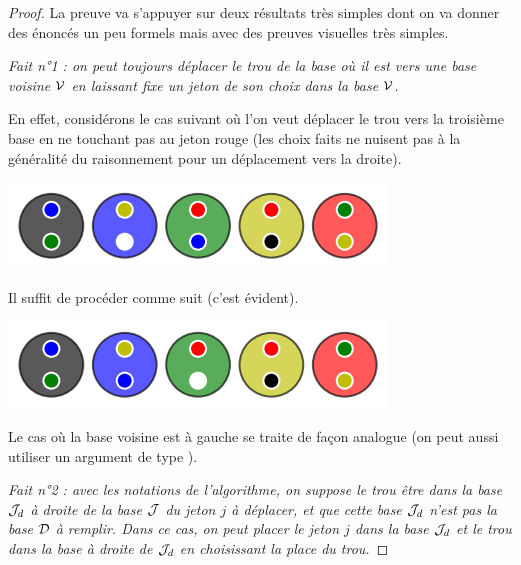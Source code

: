 \begin{proof}
	La preuve va s'appuyer sur deux résultats très simples dont on va donner des énoncés un peu formels mais avec des preuves visuelles très simples.


	\medskip

	\textit{Fait n°1 : on peut toujours déplacer le trou de la base où il est vers une base voisine $\cal V$ en laissant fixe un jeton de son choix dans la base $\cal V$.} 

	
	\medskip

	En effet, considérons le cas suivant où l'on veut déplacer le trou vers la troisième base en ne touchant pas au jeton rouge (les choix faits ne nuisent pas à la généralité du raisonnement pour un déplacement vers la droite).

	\vspace{-0.4em}
	\begin{center}   %
		\includegraphics[scale= 0.45]{content/algo_selection/fact_1/000.png}
	\end{center}
	\vspace{-0.8em}

	Il suffit de procéder comme suit (c'est évident).

	\vspace{-0.4em}
	\begin{center}   %
		\includegraphics[scale= 0.45]{content/algo_selection/fact_1/001.png}
	\end{center}
	\vspace{-0.8em}

	Le cas où la base voisine est à gauche se traite de façon analogue (on peut aussi utiliser un argument de type ).


	\medskip

	\textit{Fait n°2 : avec les notations de l'algorithme, on suppose le trou être dans la base ${\cal J}_d$ à droite de la base $\cal J$ du jeton $j$ à déplacer, et que cette base ${\cal J}_d$ n'est pas la base $\cal D$ à remplir. Dans ce cas, on peut placer le jeton $j$ dans la base ${\cal J}_d$ et le trou dans la base à droite de ${\cal J}_d$ en choisissant la place du trou.}


\end{proof}
